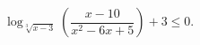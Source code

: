 \begin{ex}[type=inequality]
	\begin{condition}
		$\log_{\sqrt[3]{x - 3}}\left(\dfrac{x - 10}{x^2 - 6x + 5}\right) + 3\leqslant0  .$
	\end{condition}
\end{ex}